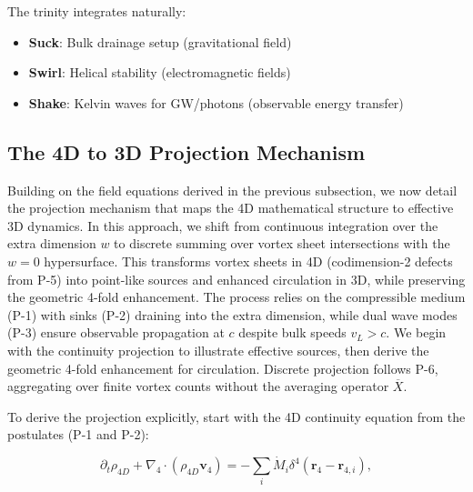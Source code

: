 The trinity integrates naturally:
\begin{itemize}
\item \textbf{Suck}: Bulk drainage setup (gravitational field)
\item \textbf{Swirl}: Helical stability (electromagnetic fields)
\item \textbf{Shake}: Kelvin waves for GW/photons (observable energy transfer)
\end{itemize}


\subsection{The 4D to 3D Projection Mechanism}
\label{sec:projection}

Building on the field equations derived in the previous subsection, we now detail the projection mechanism that maps the 4D mathematical structure to effective 3D dynamics. In this approach, we shift from continuous integration over the extra dimension $w$ to discrete summing over vortex sheet intersections with the $w=0$ hypersurface. This transforms vortex sheets in 4D (codimension-2 defects from P-5) into point-like sources and enhanced circulation in 3D, while preserving the geometric 4-fold enhancement. The process relies on the compressible medium (P-1) with sinks (P-2) draining into the extra dimension, while dual wave modes (P-3) ensure observable propagation at $c$ despite bulk speeds $v_L > c$. We begin with the continuity projection to illustrate effective sources, then derive the geometric 4-fold enhancement for circulation. Discrete projection follows P-6, aggregating over finite vortex counts without the averaging operator $\overline{X}$.

To derive the projection explicitly, start with the 4D continuity equation from the postulates (P-1 and P-2):

\begin{equation}
\partial_t \rho_{4D} + \nabla_4 \cdot (\rho_{4D} \mathbf{v}_4) = -\sum_i \dot{M}_i \delta^4(\mathbf{r}_4 - \mathbf{r}_{4,i}),
\end{equation}

